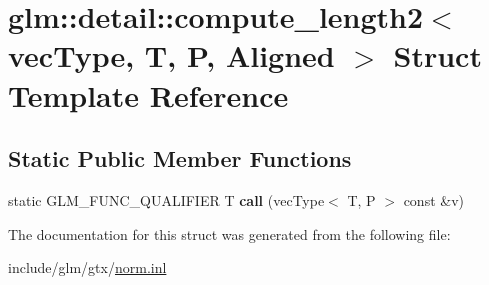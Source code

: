 \hypertarget{structglm_1_1detail_1_1compute__length2}{}\section{glm\+:\+:detail\+:\+:compute\+\_\+length2$<$ vec\+Type, T, P, Aligned $>$ Struct Template Reference}
\label{structglm_1_1detail_1_1compute__length2}
\subsection*{Static Public Member Functions}
\begin{DoxyCompactItemize}
\item 
\mbox{\label{structglm_1_1detail_1_1compute__length2_ac5b7c631e103be04ad7510c8ed50f1d0}} 
static G\+L\+M\+\_\+\+F\+U\+N\+C\+\_\+\+Q\+U\+A\+L\+I\+F\+I\+ER T {\bfseries call} (vec\+Type$<$ T, P $>$ const \&v)
\end{DoxyCompactItemize}


The documentation for this struct was generated from the following file\+:\begin{DoxyCompactItemize}
\item 
include/glm/gtx/\hyperlink{norm_8inl}{norm.\+inl}\end{DoxyCompactItemize}
